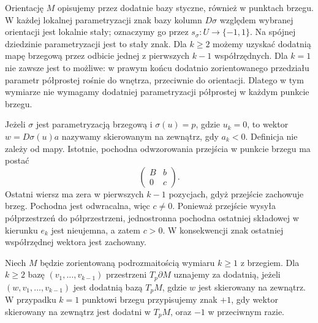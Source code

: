 Orientację $M$ opisujemy przez dodatnie bazy
styczne, również w punktach brzegu. W każdej
lokalnej parametryzacji znak bazy kolumn
$D\sigma$ względem wybranej orientacji jest
lokalnie stały; oznaczymy go przez
$s_\sigma:U\to\{-1,1\}$. Na spójnej dziedzinie
parametryzacji jest to stały znak.
Dla $k\ge2$ możemy uzyskać dodatnią mapę brzegową
przez odbicie jednej z pierwszych $k-1$ współrzędnych.
Dla $k=1$ nie zawsze jest to możliwe: w prawym końcu
dodatnio zorientowanego przedziału parametr
półprostej rośnie do wnętrza, przeciwnie do orientacji.
Dlatego w tym wymiarze nie wymagamy dodatniej
parametryzacji półprostej w każdym punkcie brzegu.

Jeżeli $\sigma$ jest parametryzacją brzegową i
$\sigma(u)=p$, gdzie $u_k=0$, to wektor
$w=D\sigma(u)a$ nazywamy skierowanym na zewnątrz,
gdy $a_k<0$. Definicja nie zależy od mapy.
Istotnie, pochodna odwzorowania przejścia
w punkcie brzegu ma postać
\[
 \begin{pmatrix} B&b\\0&c\end{pmatrix}.
\]
Ostatni wiersz ma zera w pierwszych $k-1$
pozycjach, gdyż przejście zachowuje brzeg.
Pochodna jest odwracalna, więc $c\ne0$.
Ponieważ przejście wysyła półprzestrzeń do
półprzestrzeni, jednostronna pochodna
ostatniej składowej w kierunku $e_k$ jest
nieujemna, a zatem $c>0$.
W konsekwencji znak ostatniej współrzędnej
wektora jest zachowany.

\begin{definicja}
\label{ma2:def:boundary-orientation}
Niech $M$ będzie zorientowaną podrozmaitością
wymiaru $k\ge1$ z brzegiem. Dla $k\ge2$ bazę $(v_1,\ldots,v_{k-1})$ przestrzeni
$T_p\partial M$ uznajemy za dodatnią, jeżeli
$(w,v_1,\ldots,v_{k-1})$ jest dodatnią bazą
$T_pM$, gdzie $w$ jest skierowany na zewnątrz.
W przypadku $k=1$ punktowi brzegu przypisujemy
znak $+1$, gdy wektor skierowany na zewnątrz
jest dodatni w $T_pM$, oraz $-1$ w przeciwnym razie.
\end{definicja}

